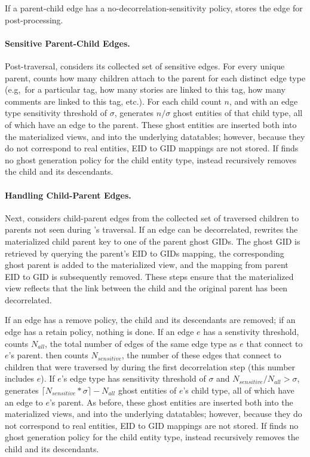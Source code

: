 If a parent-child edge has a no-decorrelation-sensitivity policy, \sys{} stores the edge for
post-processing.

\paragraph{Sensitive Parent-Child Edges.}
Post-traversal, \sys{} considers its collected set of sensitive edges. For every unique parent,
\sys{} counts how many children attach to the parent for each distinct edge type (e.g,\ for a
particular tag, how many stories are linked to this tag, how many comments are linked to this tag,
etc.). For each child count $n$, and with an edge type sensitivity threshold of $\sigma$, 
\sys{} generates $n / \sigma$ ghost entities of that child type, all of which have an edge to the parent.
These ghost entities are inserted both into the materialized views, and into the underlying
datatables; however, because they do not correspond to real entities, EID to GID mappings are not
stored. 
If \sys{} finds no ghost generation policy for the child entity type, \sys{} instead recursively
removes the child and its descendants.

\paragraph{Handling Child-Parent Edges.}
Next, \sys{} considers child-parent edges from the collected set of traversed children to parents
not seen during \sys{}'s traversal. If an 
edge can be decorrelated, \sys{} rewrites the materialized child parent key to one of the parent
ghost GIDs. The ghost GID is retrieved by querying the parent's EID to GIDs mapping, the
corresponding ghost parent is added to the materialized view,
and the mapping from parent EID to GID is subsequently removed. These steps ensure that the
materialized view reflects that the link between the child and the original parent has been
decorrelated.

If an edge has a remove policy, the child and its descendants are removed; if an edge has a retain
policy, nothing is done. 
If an edge $e$ has a senstivity threshold,
\sys{} counts $N_{all}$, the total number of edges of the same edge type as $e$ that connect to $e$'s parent.
\sys{} then counts $N_{sensitive}$, the number of these edges that connect to children that were traversed by \sys{} during the
first decorrelation step (this number includes $e$).
If $e$'s edge type has sensitivity threshold of $\sigma$ and $N_{sensitive} / N_{all} > \sigma$,
\sys{} generates $\lceil N_{sensitive}*\sigma\rceil - N_{all}$ ghost entities of $e$'s child type, all
of which have an edge to $e$'s parent.
As before, these ghost entities are inserted both into the materialized views, and into the underlying
datatables; however, because they do not correspond to real entities, EID to GID mappings are not
stored. 
If \sys{} finds no ghost generation policy for the child entity type, \sys{} instead recursively
removes the child and its descendants.

